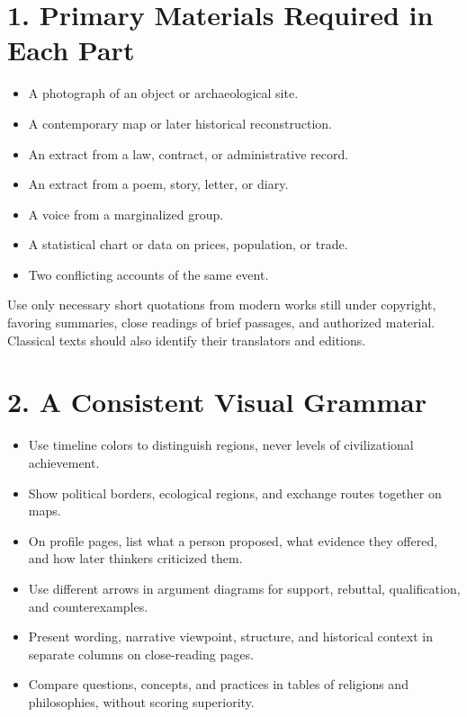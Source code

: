 \section*{1. Primary Materials Required in Each Part}
\begin{itemize}
\item A photograph of an object or archaeological site.
\item A contemporary map or later historical reconstruction.
\item An extract from a law, contract, or administrative record.
\item An extract from a poem, story, letter, or diary.
\item A voice from a marginalized group.
\item A statistical chart or data on prices, population, or trade.
\item Two conflicting accounts of the same event.
\end{itemize}
Use only necessary short quotations from modern works still under copyright, favoring summaries, close readings of brief passages, and authorized material. Classical texts should also identify their translators and editions.

\section*{2. A Consistent Visual Grammar}
\begin{itemize}
\item Use timeline colors to distinguish regions, never levels of civilizational achievement.
\item Show political borders, ecological regions, and exchange routes together on maps.
\item On profile pages, list what a person proposed, what evidence they offered, and how later thinkers criticized them.
\item Use different arrows in argument diagrams for support, rebuttal, qualification, and counterexamples.
\item Present wording, narrative viewpoint, structure, and historical context in separate columns on close-reading pages.
\item Compare questions, concepts, and practices in tables of religions and philosophies, without scoring superiority.
\end{itemize}
